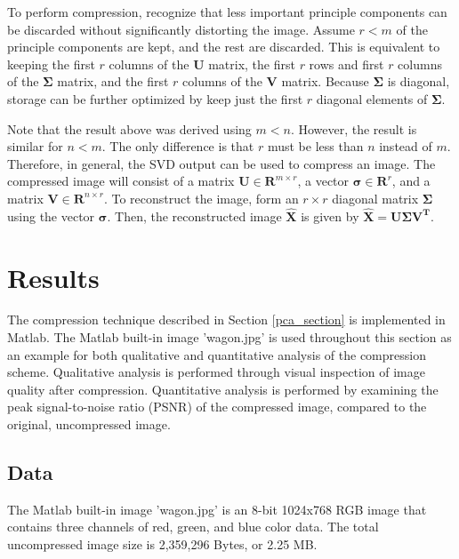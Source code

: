 \documentclass[conference]{IEEEtran}
\begin{document}
    	To perform compression, recognize that less important principle components can be discarded without significantly distorting the image.  Assume $r < m$ of the principle components are kept, and the rest are discarded. This is equivalent to keeping the first $r$ columns of the $\mathbf{U}$ matrix, the first $r$ rows and first $r$ columns of the $\mathbf{\Sigma}$ matrix, and the first $r$ columns of the $\mathbf{V}$ matrix. Because $\mathbf{\Sigma}$ is diagonal, storage can be further optimized by keep just the first $r$ diagonal elements of $\mathbf{\Sigma}$.
    	
    	Note that the result above was derived using $m < n$. However, the result is similar for $n < m$. The only difference is that $r$ must be less than $n$ instead of $m$. Therefore, in general, the SVD output can be used to compress an image. The compressed image will consist of a matrix $\mathbf{U} \in \mathbf{R}^{m \times r}$, a vector $\mathbf{\sigma} \in \mathbf{R}^{r}$, and a matrix $\mathbf{V} \in \mathbf{R}^{n \times r}$. To reconstruct the image, form an $r \times r$ diagonal matrix $\mathbf{\Sigma}$ using the vector $\mathbf{\sigma}$. Then, the reconstructed image $\mathbf{\hat{X}}$ is given by $\mathbf{\hat{X}} = \mathbf{U{\Sigma}V^T}$.
    	  

    \section{Results}

    The compression technique described in Section \ref{pca_section} is implemented in Matlab. The Matlab built-in image 'wagon.jpg' is used throughout this section as an example for both qualitative and quantitative analysis of the compression scheme. Qualitative analysis is performed through visual inspection of image quality after compression. Quantitative analysis is performed by examining the peak signal-to-noise ratio (PSNR) of the compressed image, compared to the original, uncompressed image.

    \subsection{Data}
    The Matlab built-in image 'wagon.jpg' is an 8-bit 1024x768 RGB image that contains three channels of red, green, and blue color data. The total uncompressed image size is 2,359,296 Bytes, or 2.25 MB.
\end{document}
